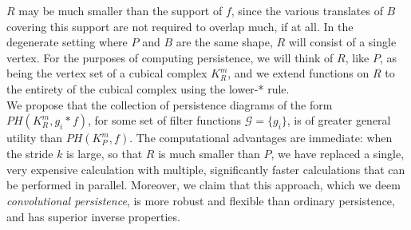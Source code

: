 \documentclass[conference]{IEEEtran}
\theoremstyle{definition}
\numberwithin{figure}{section}
\begin{document}
$R$ may be much smaller than the support of $f$, since the various translates of $B$ covering this support are not required to overlap much, if at all. In the degenerate setting where $P$ and $B$ are the same shape, $R$ will consist of a single vertex. For the purposes of computing persistence, we will think of $R$, like $P$, as being the vertex set of a cubical complex $K_{R}^{m}$, and we extend functions on $R$ to the entirety of the cubical complex using the lower-* rule.\\

We propose that the collection of persistence diagrams of the form $PH(K_{R}^{m},g_{i} \ast f)$, for some set of filter functions $\mathcal{G} = \{g_i\}$, is of greater general utility than $PH(K_{P}^{m},f)$. The computational advantages are immediate: when the stride $k$ is large, so that $R$ is much smaller than $P$, we have replaced a single, very expensive calculation with multiple, significantly faster calculations that can be performed in parallel. Moreover, we claim that this approach, which we deem \emph{convolutional persistence}, is more robust and flexible than ordinary persistence, and has superior inverse properties.\\



\end{document}
